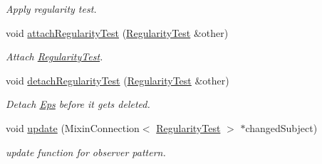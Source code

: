 \begin{DoxyCompactItemize}
\begin{DoxyCompactList}\small\item\em Apply regularity test. \end{DoxyCompactList}\item 
void \hyperlink{classSpacy_1_1Mixin_1_1RegularityTest_aeb6598687d622ef266d1ed515d2b42bf_aeb6598687d622ef266d1ed515d2b42bf}{attach\+Regularity\+Test} (\hyperlink{classSpacy_1_1Mixin_1_1RegularityTest_ae2887fec9a5bdd42239b3df6750bf2e9_ae2887fec9a5bdd42239b3df6750bf2e9}{Regularity\+Test} \&other)
\begin{DoxyCompactList}\small\item\em Attach \hyperlink{classSpacy_1_1Mixin_1_1RegularityTest}{Regularity\+Test}. \end{DoxyCompactList}\item 
\hypertarget{classSpacy_1_1Mixin_1_1RegularityTest_a289d6422bd82864d661bdbcfc7dc321e}{}void \hyperlink{classSpacy_1_1Mixin_1_1RegularityTest_a289d6422bd82864d661bdbcfc7dc321e}{detach\+Regularity\+Test} (\hyperlink{classSpacy_1_1Mixin_1_1RegularityTest_ae2887fec9a5bdd42239b3df6750bf2e9_ae2887fec9a5bdd42239b3df6750bf2e9}{Regularity\+Test} \&other)\label{classSpacy_1_1Mixin_1_1RegularityTest_a289d6422bd82864d661bdbcfc7dc321e}

\begin{DoxyCompactList}\small\item\em Detach \hyperlink{classSpacy_1_1Mixin_1_1Eps}{Eps} before it gets deleted. \end{DoxyCompactList}\item 
\hypertarget{classSpacy_1_1Mixin_1_1RegularityTest_ae3bfc55bec9fe3068adffb6d24b3b964}{}void \hyperlink{classSpacy_1_1Mixin_1_1RegularityTest_ae3bfc55bec9fe3068adffb6d24b3b964}{update} (Mixin\+Connection$<$ \hyperlink{classSpacy_1_1Mixin_1_1RegularityTest_ae2887fec9a5bdd42239b3df6750bf2e9_ae2887fec9a5bdd42239b3df6750bf2e9}{Regularity\+Test} $>$ $\ast$changed\+Subject)\label{classSpacy_1_1Mixin_1_1RegularityTest_ae3bfc55bec9fe3068adffb6d24b3b964}

\begin{DoxyCompactList}\small\item\em update function for observer pattern. \end{DoxyCompactList}\end{DoxyCompactItemize}
